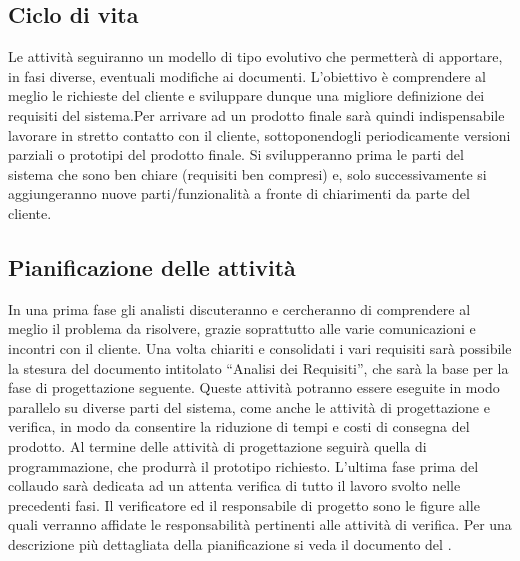 \documentclass[11pt,titlepage,a4paper]{report}
\begin{document}
\subsection{Ciclo di vita}
Le attivit\`a seguiranno un modello di tipo evolutivo che permetter\`a di apportare, in fasi diverse, eventuali modifiche ai documenti. L'obiettivo \`e comprendere al meglio le richieste del cliente e sviluppare dunque una migliore definizione dei requisiti del sistema.\newline Per arrivare ad un prodotto finale sar\`a quindi indispensabile lavorare in stretto contatto con il cliente, sottoponendogli periodicamente versioni parziali o prototipi del prodotto finale. Si svilupperanno prima le parti del sistema che sono ben chiare (requisiti ben compresi) e, solo successivamente si aggiungeranno nuove parti/funzionalit\`a a fronte di chiarimenti da parte del cliente. 
\subsection{Pianificazione delle attivit\`a}
In una prima fase gli analisti discuteranno e cercheranno di comprendere al meglio il problema da risolvere, grazie soprattutto alle varie comunicazioni e incontri con il cliente. Una volta chiariti e consolidati i vari requisiti sar\`a possibile la stesura del documento intitolato ``Analisi dei Requisiti'', che sar\`a la base per la fase di progettazione seguente. Queste attivit\`a potranno essere eseguite in modo parallelo su diverse parti del sistema, come anche le attivit\`a di progettazione e verifica, in modo da consentire la riduzione di tempi e costi di consegna del prodotto. Al termine delle attivit\`a di progettazione seguir\`a quella di programmazione, che produrr\`a il prototipo richiesto. L'ultima fase prima del collaudo sar\`a dedicata ad un attenta verifica di tutto il lavoro svolto nelle precedenti fasi. Il verificatore ed il responsabile di progetto sono le figure alle quali verranno affidate le responsabilit\`a pertinenti alle attivit\`a di verifica. Per una descrizione pi\`u dettagliata della pianificazione si veda il documento del \PianoDiProgetto .
\end{document}
